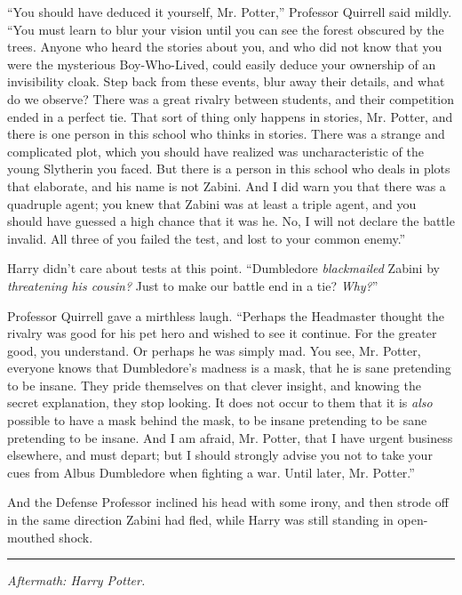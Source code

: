 ``You should have deduced it yourself, Mr. Potter,'' Professor Quirrell said mildly. ``You must learn to blur your vision until you can see the forest obscured by the trees. Anyone who heard the stories about you, and who did not know that you were the mysterious Boy-Who-Lived, could easily deduce your ownership of an invisibility cloak. Step back from these events, blur away their details, and what do we observe? There was a great rivalry between students, and their competition ended in a perfect tie. That sort of thing only happens in stories, Mr. Potter, and there is one person in this school who thinks in stories. There was a strange and complicated plot, which you should have realized was uncharacteristic of the young Slytherin you faced. But there is a person in this school who deals in plots that elaborate, and his name is not Zabini. And I did warn you that there was a quadruple agent; you knew that Zabini was at least a triple agent, and you should have guessed a high chance that it was he. No, I will not declare the battle invalid. All three of you failed the test, and lost to your common enemy.''

Harry didn't care about tests at this point. ``Dumbledore \emph{blackmailed} Zabini by \emph{threatening his cousin?} Just to make our battle end in a tie? \emph{Why?}''

Professor Quirrell gave a mirthless laugh. ``Perhaps the Headmaster thought the rivalry was good for his pet hero and wished to see it continue. For the greater good, you understand. Or perhaps he was simply mad. You see, Mr. Potter, everyone knows that Dumbledore's madness is a mask, that he is sane pretending to be insane. They pride themselves on that clever insight, and knowing the secret explanation, they stop looking. It does not occur to them that it is \emph{also} possible to have a mask behind the mask, to be insane pretending to be sane pretending to be insane. And I am afraid, Mr. Potter, that I have urgent business elsewhere, and must depart; but I should strongly advise you not to take your cues from Albus Dumbledore when fighting a war. Until later, Mr. Potter.''

And the Defense Professor inclined his head with some irony, and then strode off in the same direction Zabini had fled, while Harry was still standing in open-mouthed shock.

\begin{center}\rule{3in}{0.4pt}\end{center}

\emph{Aftermath: Harry Potter.}

